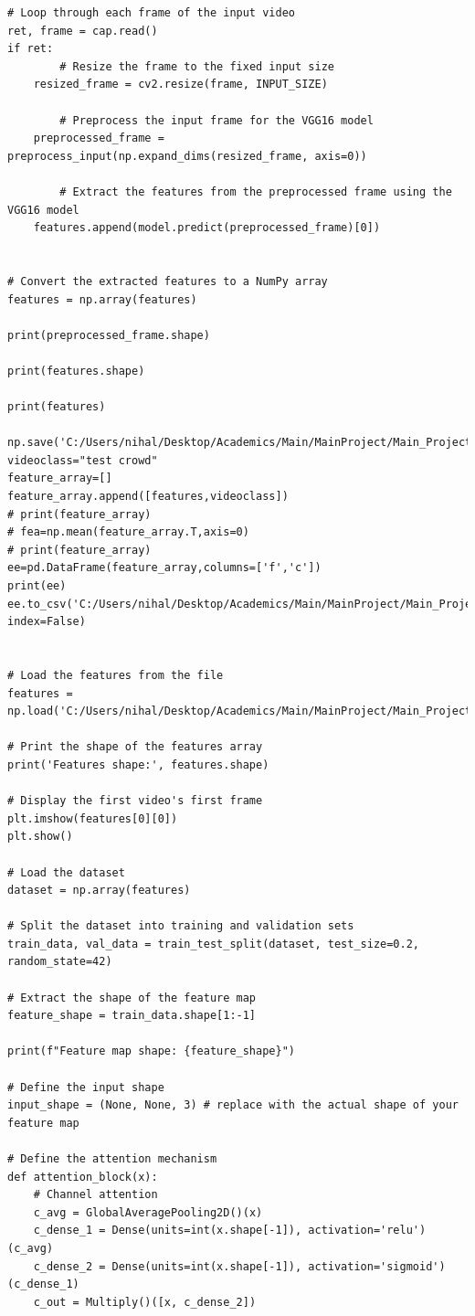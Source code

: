 \documentclass[12pt]{report}
\begin{document}
\begin{lstlisting}
# Loop through each frame of the input video
ret, frame = cap.read()
if ret:
        # Resize the frame to the fixed input size
    resized_frame = cv2.resize(frame, INPUT_SIZE)
        
        # Preprocess the input frame for the VGG16 model
    preprocessed_frame = preprocess_input(np.expand_dims(resized_frame, axis=0))
        
        # Extract the features from the preprocessed frame using the VGG16 model
    features.append(model.predict(preprocessed_frame)[0])
        

# Convert the extracted features to a NumPy array
features = np.array(features)

print(preprocessed_frame.shape)

print(features.shape)

print(features)

np.save('C:/Users/nihal/Desktop/Academics/Main/MainProject/Main_Project/Project/features.npy',features)
videoclass="test crowd"
feature_array=[]
feature_array.append([features,videoclass])
# print(feature_array)
# fea=np.mean(feature_array.T,axis=0)
# print(feature_array)
ee=pd.DataFrame(feature_array,columns=['f','c'])
print(ee)
ee.to_csv('C:/Users/nihal/Desktop/Academics/Main/MainProject/Main_Project/Project/my_data.csv', index=False)


# Load the features from the file
features = np.load('C:/Users/nihal/Desktop/Academics/Main/MainProject/Main_Project/Project/features.npy')

# Print the shape of the features array
print('Features shape:', features.shape)

# Display the first video's first frame
plt.imshow(features[0][0])
plt.show()

# Load the dataset
dataset = np.array(features)

# Split the dataset into training and validation sets
train_data, val_data = train_test_split(dataset, test_size=0.2, random_state=42)

# Extract the shape of the feature map
feature_shape = train_data.shape[1:-1]

print(f"Feature map shape: {feature_shape}")

# Define the input shape
input_shape = (None, None, 3) # replace with the actual shape of your feature map

# Define the attention mechanism
def attention_block(x):
    # Channel attention
    c_avg = GlobalAveragePooling2D()(x)
    c_dense_1 = Dense(units=int(x.shape[-1]), activation='relu')(c_avg)
    c_dense_2 = Dense(units=int(x.shape[-1]), activation='sigmoid')(c_dense_1)
    c_out = Multiply()([x, c_dense_2])
    

\end{lstlisting}
\end{document}
